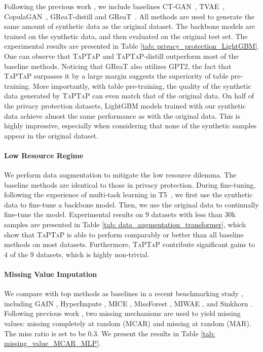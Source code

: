 Following the previous work \citep{GReaT}, we include baselines {CT-GAN}~\citep{DBLP:conf/nips/CTGAN}, {TVAE}~\citep{DBLP:conf/nips/CTGAN}, {CopulaGAN}~\citep{CopulaGAN}, {GReaT-distill} and {GReaT}~\citep{GReaT}. All methods are used to generate the same amount of synthetic data as the original dataset. The backbone models are trained on the synthetic data, and then evaluated on the original test set. The experimental results are presented in Table \ref{tab: privacy_protection_LightGBM}. One can observe that \textsc{TaPTaP} and \textsc{TaPTaP}-distill outperform most of the baseline methods. Noticing that GReaT also utilizes GPT2, the fact that \textsc{TaPTaP} surpasses it by a large margin suggests the superiority of table pre-training. More importantly, with table pre-training, the quality of the synthetic data generated by \textsc{TaPTaP} can even match that of the original data. On half of the privacy protection datasets, LightGBM models trained with our synthetic data achieve almost the same performance as with the original data. This is highly impressive, especially when considering that none of the synthetic samples appear in the original dataset.

\paragraph{Low Resource Regime} We perform data augmentation to mitigate the low resource dilemma. The baseline methods are identical to those in privacy protection. During fine-tuning, following the experience of multi-task learning in T5~\citep{T5}, we first use the synthetic data to fine-tune a backbone model. Then, we use the original data to continually fine-tune the model. Experimental results on $9$ datasets with less than $30$k samples are presented in Table \ref{tab: data_augmentation_transformer}, which show that \textsc{TaPTaP} is able to perform comparably or better than all baseline methods on most datasets. Furthermore, \textsc{TaPTaP} contribute significant gains to $4$ of the $9$ datasets, which is highly non-trivial.

\paragraph{Missing Value Imputation}

We compare with top methods as baselines in a recent benchmarking study \cite{HyperImpute}, including {GAIN} \citep{GAIN}, {HyperImpute} \citep{HyperImpute}, {MICE} \citep{MICE},  {MissForest} \citep{MissForest}, {MIWAE} \citep{MIWAE}, and {Sinkhorn} \citep{Sinkhorn}. Following previous work \citep{HyperImpute}, two missing mechanisms are used to yield missing values: missing completely at random (MCAR) and missing at random (MAR). The miss ratio is set to be $0.3$. We present the results in Table \ref{tab: missing_value_MCAR_MLP}. 

